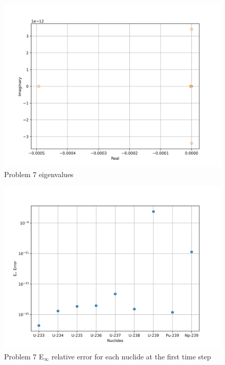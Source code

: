 \begin{figure}[p]
    \centering
    \includegraphics[width=6in]{images/chapter-5/progressionProblems/problem7/problem7Eigenvalues.png}
    \caption{Problem 7 eigenvalues}
    \label{fig:problem7_eigenvalues}
\end{figure}

\clearpage

\begin{figure}[p]
    \centering
    \includegraphics[width=6in]{images/chapter-5/progressionProblems/problem7/problem7NuclideErrorFirstStep.png}
    \caption{Problem 7 E${}_{\infty}$ relative error for each nuclide at the first time step}
    \label{fig:problem7_nuclide_relative_error}
\end{figure}

